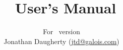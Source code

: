 \title{\mathblog\ User's Manual}
\author{
  For \mathblog\ version \mathblogversion\\
  Jonathan Daugherty (\href{mailto:jtd@galois.com}{jtd@galois.com})
}
\maketitle
